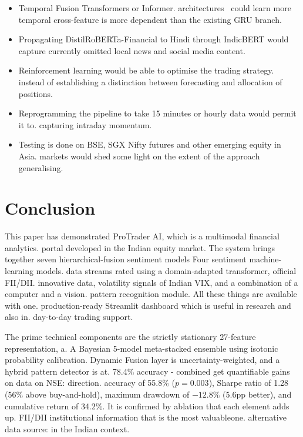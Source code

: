 \documentclass[10pt,a4paper,twoside]{article}
\begin{document}
\begin{itemize}
\item Temporal Fusion Transformers or Informer.
  architectures~\cite{vaswani2017} could learn more temporal cross-feature
  is more dependent than the existing GRU branch.
\item Propagating DistilRoBERTa-Financial to Hindi through IndicBERT would capture
  currently omitted local news and social media content.
\item Reinforcement learning would be able to optimise the trading strategy.
  instead of establishing a distinction between forecasting and allocation of positions.
\item Reprogramming the pipeline to take 15 minutes or hourly data would permit it to.
  capturing intraday momentum.
\item Testing is done on BSE, SGX Nifty futures and other emerging equity in Asia.
  markets would shed some light on the extent of the approach generalising.
\end{itemize}

\section{Conclusion}

This paper has demonstrated ProTrader AI, which is a multimodal financial analytics.
portal developed in the Indian equity market. The system brings together seven
hierarchical-fusion sentiment models Four sentiment machine-learning models.
data streams rated using a domain-adapted transformer, official FII/DII.
innovative data, volatility signals of Indian VIX, and a combination of a computer and a vision.
pattern recognition module. All these things are available with one.
production-ready Streamlit dashboard which is useful in research and also in.
day-to-day trading support.

The prime technical components are the strictly stationary 27-feature representation, a.
A Bayesian 5-model meta-stacked ensemble using isotonic probability calibration.
Dynamic Fusion layer is uncertainty-weighted, and a hybrid pattern detector is at.
78.4\% accuracy - combined get quantifiable gains on data on NSE: direction.
accuracy of 55.8\% ($p = 0.003$), Sharpe ratio of 1.28 (56\% above
buy-and-hold), maximum drawdown of $-12.8\%$ (5.6pp better), and cumulative
return of 34.2\%. It is confirmed by ablation that each element adds up.
FII/DII institutional information that is the most valuableone.
alternative data source: in the Indian context.
\end{document}

